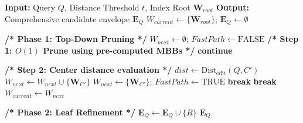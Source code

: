 \documentclass[10pt,runningheads]{llncs}
\begin{document}
\begin{algorithm*}[p]
\caption{Hierarchical Multilateration Search}
\label{alg:navigation}
\small
\begin{algorithmic}[1]
    \setlength{\itemsep}{0.05em}
    \State \textbf{Input:} Query $Q$, Distance Threshold $t$, Index Root $\textbf{W}_{root}$
    \State \textbf{Output:} Comprehensive candidate envelope $\textbf{E}_Q$
    \State $W_{current} \leftarrow \{\textbf{W}_{root}\}$; \quad $\textbf{E}_Q \leftarrow \emptyset$

    \State \textbf{/* Phase 1: Top-Down Pruning */}
        \State $W_{next} \leftarrow \emptyset$; \quad $FastPath \leftarrow \text{FALSE}$
                \State \textbf{/* Step 1: $O(1)$ Prune using pre-computed MBBs */}
                    \State \textbf{continue} 
                \EndIf
                
                \State \textbf{/* Step 2: Center distance evaluation */}
                \State $dist \leftarrow \mathrm{Dist}_{\mathrm{edit}}(Q, C')$
                 
                    \State $W_{next} \leftarrow W_{next} \cup \{\textbf{W}_{C'}\}$
                     
                        \State $W_{next} \leftarrow \{\textbf{W}_{C'}\}$; \quad $FastPath \leftarrow \text{TRUE}$
                        \State \textbf{break} 
                    \EndIf
                \EndIf
            \EndFor
             \State \textbf{break} \EndIf
        \EndFor
        \State $W_{current} \leftarrow W_{next}$
    \EndFor

    \State \textbf{/* Phase 2: Leaf Refinement */}
                    \State $\textbf{E}_Q \leftarrow \textbf{E}_Q \cup \{R\}$ 
                \EndIf
            \EndIf
        \EndFor
    \EndFor
    \State \Return $\textbf{E}_Q$
\end{algorithmic}
\end{algorithm*}
\end{document}
